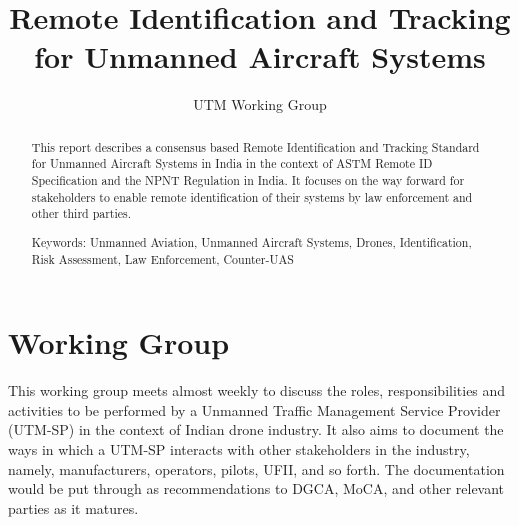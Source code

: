 \documentclass{ua_wgs_base}
\begin{document}
\title{Remote Identification and Tracking for Unmanned Aircraft Systems}

\author{UTM Working Group}

\maketitle
\cleardoublepage{}
\begin{abstract}
This report describes a consensus based Remote Identification and
Tracking Standard for Unmanned Aircraft Systems in India in the context
of ASTM 
Remote ID Specification and the NPNT Regulation
in India. It focuses on the way forward for stakeholders to enable
remote identification of their systems by law enforcement and other
third parties.

Keywords: Unmanned Aviation, Unmanned Aircraft Systems, Drones, Identification,
Risk Assessment, Law Enforcement, Counter-UAS

\tableofcontents{}
\end{abstract}

\chapter*{Working Group\label{sec:wg}}


This working group meets almost weekly to discuss the roles, responsibilities
and activities to be performed by a Unmanned Traffic Management Service
Provider (UTM-SP)
in the context of Indian drone industry. It also aims to document
the ways in which a UTM-SP interacts with other stakeholders in the
industry, namely, manufacturers, operators, pilots, UFII, and so forth.
The documentation would be put through as recommendations to DGCA,
MoCA,
and other relevant parties as it matures.
\end{document}
